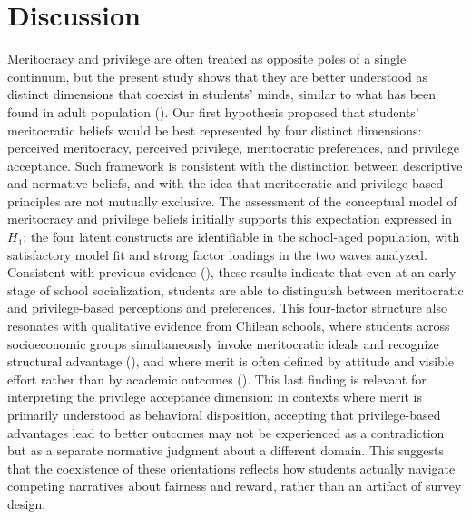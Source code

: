 \documentclass[
  13pt,
]{article}
\begin{document}
\section{Discussion}\label{discussion}

Meritocracy and privilege are often treated as opposite poles of a
single continuum, but the present study shows that they are better
understood as distinct dimensions that coexist in students' minds,
similar to what has been found in adult population
().
Our first hypothesis proposed that students' meritocratic beliefs would
be best represented by four distinct dimensions: perceived meritocracy,
perceived privilege, meritocratic preferences, and privilege acceptance.
Such framework is consistent with the distinction between descriptive
and normative beliefs, and with the idea that meritocratic and
privilege-based principles are not mutually exclusive. The assessment of
the conceptual model of meritocracy and privilege beliefs initially
supports this expectation expressed in \(H_1\): the four latent
constructs are identifiable in the school-aged population, with
satisfactory model fit and strong factor loadings in the two waves
analyzed. Consistent with previous evidence
(),
these results indicate that even at an early stage of school
socialization, students are able to distinguish between meritocratic and
privilege-based perceptions and preferences. This four-factor structure
also resonates with qualitative evidence from Chilean schools, where
students across socioeconomic groups simultaneously invoke meritocratic
ideals and recognize structural advantage
(), and where merit is often defined by attitude and visible effort
rather than by academic outcomes
().
This last finding is relevant for interpreting the privilege acceptance
dimension: in contexts where merit is primarily understood as behavioral
disposition, accepting that privilege-based advantages lead to better
outcomes may not be experienced as a contradiction but as a separate
normative judgment about a different domain. This suggests that the
coexistence of these orientations reflects how students actually
navigate competing narratives about fairness and reward, rather than an
artifact of survey design.
\end{document}
